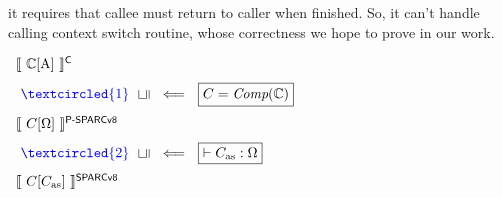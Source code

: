 it requires that callee must return to caller when 
finished. So, it can't handle calling context switch 
routine, whose correctness we hope to prove in our work. 
\begin{center}
    $
        \begin{array}{l}
            \semantics{\Clang[\AbsPrimC]}^{\textsf{C}}
            \\
            \\[-5pt]
            \ 
            {\color{blue} \textcircled{1}} \ \ 
            \rotatebox[origin=c]{90}{$\refine$} \ \  
            \Longleftarrow \ \ 
            \boxed{C = \textit{Comp}(\Clang)}
            \\
            \\[-5pt]
            \semantics{\code[\hprimset]}^{\textsf{P-SPARCv8}}
            \\
            \\[-5pt]
            \  
            {\color{blue} \textcircled{2}} \ \ 
            \rotatebox[origin=c]{90}{$\refine$} \ \ 
            \Longleftarrow \ \ 
            \boxed{\vdash\asmimp:\hprimset}
            \\
            \\[-5pt]
            \semantics{\code[\asmimp]}^{\textsf{SPARCv8}}
        \end{array}
    $
    \label{fig:idea to establish contextual refinement}
\end{center}

